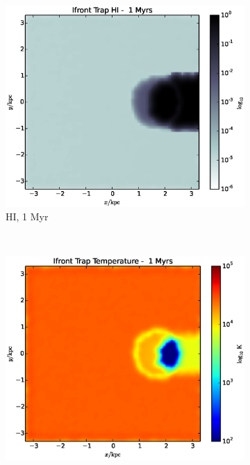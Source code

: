 \begin{figure}
        \centering
        \begin{subfigure}[b]{0.45\textwidth}
                \includegraphics[width=\textwidth]{graphics/ifrontTrap00010HI.eps}
                \caption{HI, 1 Myr}
                \label{fig:ifronttrap1a}
        \end{subfigure}
        ~ 
        \begin{subfigure}[b]{0.45\textwidth}
                \includegraphics[width=\textwidth]{graphics/ifrontTrap00010Temp.eps}

\end{subfigure}
\end{figure}
